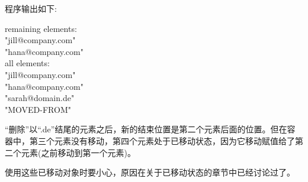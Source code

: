 程序输出如下:\par

\begin{tcolorbox}[colback=white,colframe=black]
remaining elements: \\
"jill@company.com" \\
"hana@company.com" \\
all elements: \\
"jill@company.com" \\
"hana@company.com" \\
"sarah@domain.de" \\
"MOVED-FROM"
\end{tcolorbox}	

“删除”以“.de”结尾的元素之后，新的结束位置是第二个元素后面的位置。但在容器中，第三个元素没有移动，第四个元素处于已移动状态，因为它移动赋值给了第二个元素(之前移动到第一个元素)。\par

使用这些已移动对象时要小心，原因在关于已移动状态的章节中已经讨论过了。\par












